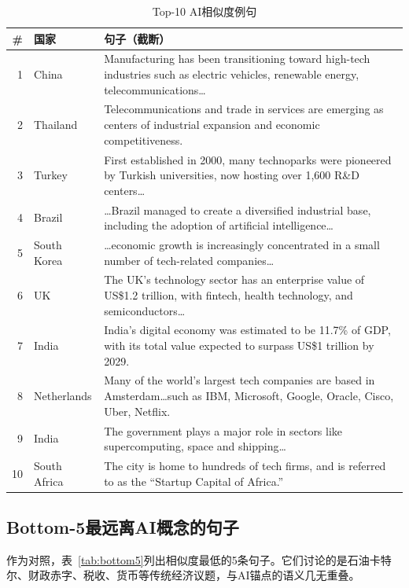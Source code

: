 \documentclass[11pt,a4paper]{article}
\begin{document}
\begin{table}[H]\centering\footnotesize
\caption{Top-10 AI相似度例句}\label{tab:top10}
\begin{tabular}{rlp{10cm}}
\toprule\textbf{\#} & \textbf{国家} & \textbf{句子（截断）} \\
\midrule
1 & China & Manufacturing has been transitioning toward high-tech industries such as electric vehicles, renewable energy, telecommunications\dots \\
2 & Thailand & Telecommunications and trade in services are emerging as centers of industrial expansion and economic competitiveness. \\
3 & Turkey & First established in 2000, many technoparks were pioneered by Turkish universities, now hosting over 1,600 R\&D centers\dots \\
4 & Brazil & \dots Brazil managed to create a diversified industrial base, including the adoption of artificial intelligence\dots \\
5 & South Korea & \dots economic growth is increasingly concentrated in a small number of tech-related companies\dots \\
6 & UK & The UK's technology sector has an enterprise value of US\$1.2 trillion, with fintech, health technology, and semiconductors\dots \\
7 & India & India's digital economy was estimated to be 11.7\% of GDP, with its total value expected to surpass US\$1 trillion by 2029. \\
8 & Netherlands & Many of the world's largest tech companies are based in Amsterdam\dots such as IBM, Microsoft, Google, Oracle, Cisco, Uber, Netflix. \\
9 & India & The government plays a major role in sectors like supercomputing, space and shipping\dots \\
10 & South Africa & The city is home to hundreds of tech firms, and is referred to as the ``Startup Capital of Africa.'' \\
\bottomrule
\end{tabular}
\end{table}

\subsection{Bottom-5最远离AI概念的句子}
作为对照，表~\ref{tab:bottom5}列出相似度最低的5条句子。它们讨论的是石油卡特尔、财政赤字、税收、货币等传统经济议题，与AI锚点的语义几无重叠。
\end{document}
